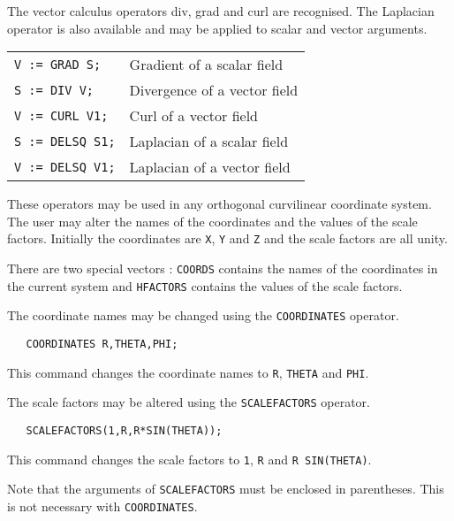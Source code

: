The vector calculus operators div, grad and curl are recognised.
The Laplacian operator is also available and may be applied to
scalar and vector arguments.

\begin{tabular}{l l}
{\tt V := GRAD S;} & Gradient of a scalar field \\
{\tt S := DIV V;} & Divergence of a vector field \\
{\tt V := CURL V1;} & Curl of a vector field \\
{\tt S := DELSQ S1;} & Laplacian of a scalar field \\
{\tt V := DELSQ V1;} & Laplacian of a vector field \\
\end{tabular}

These operators may be used in any orthogonal curvilinear coordinate
system. The user may alter the names of the coordinates and the values
of the scale factors. Initially the coordinates are {\tt X}, {\tt Y}
and {\tt Z} and the scale factors are all unity.

There are two special vectors : {\tt COORDS} contains the names
of the coordinates in the current system and {\tt HFACTORS}
contains the values of the scale factors.

The coordinate names may be changed using the {\tt COORDINATES}
operator.

\begin{verbatim}
   COORDINATES R,THETA,PHI;
\end{verbatim}

This command changes the coordinate names to {\tt R}, {\tt THETA} and
{\tt PHI}.

The scale factors may be altered using the {\tt SCALEFACTORS} operator.

\begin{verbatim}
   SCALEFACTORS(1,R,R*SIN(THETA));
\end{verbatim}

This command changes the scale factors to {\tt 1}, {\tt R} and {\tt R
SIN(THETA)}.

Note that the arguments of {\tt SCALEFACTORS} must be enclosed in
parentheses. This is not necessary with {\tt COORDINATES}.


